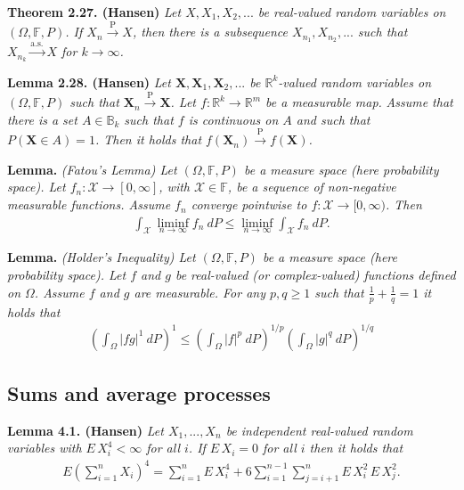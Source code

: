 \documentclass[a4paper,12pt,openany]{book}
\begin{document}
\textbf{Theorem 2.27. (Hansen)} \emph{Let \(X,X_1,X_2,...\) be real-valued random variables on \((\Omega,\mathbb{F},P)\). If \(X_n\stackrel{\text{P}}{\to} X\), then there is a subsequence \(X_{n_1},X_{n_2},...\) such that \(X_{n_k}\stackrel{\text{a.s.}}{\to} X\) for \(k\to \infty\).}

\textbf{Lemma 2.28. (Hansen)} \emph{Let \(\mathbf{X},\mathbf{X}_1,\mathbf{X}_2,...\) be \(\mathbb{R}^k\)-valued random variables on \((\Omega,\mathbb{F},P)\) such that \(\mathbf{X}_n\stackrel{\text{P}}{\to} \mathbf{X}\). Let \(f : \mathbb{R}^k\to \mathbb{R}^m\) be a measurable map.}
\emph{Assume that there is a set \(A\in\mathbb{B}_k\) such that \(f\) is continuous on \(A\) and such that \(P(\mathbf{X}\in A)=1\). Then it holds that \(f(\mathbf{X}_n)\stackrel{\text{P}}{\to} f(\mathbf{X})\).}

\textbf{Lemma.} \emph{(Fatou's Lemma) Let \((\Omega,\mathbb{F},P)\) be a measure space (here probability space). Let \(f_n : \mathcal{X} \to [0,\infty]\), with \(\mathcal{X}\in\mathbb{F}\), be a sequence of non-negative measurable functions. Assume \(f_n\) converge pointwise to \(f : \mathcal{X}\to [0,\infty)\). Then}
\begin{align*}
    \int_{\mathcal{X}} \liminf_{n\to\infty} f_n\ dP\le \liminf_{n\to\infty} \int_{\mathcal{X}} f_n\ dP.
\end{align*}

\textbf{Lemma.} \emph{(Holder's Inequality)  Let \((\Omega,\mathbb{F},P)\) be a measure space (here probability space). Let \(f\) and \(g\) be real-valued (or complex-valued) functions defined on \(\Omega\). Assume \(f\) and \(g\) are measurable. For any \(p,q\ge 1\) such that \(\frac{1}{p}+\frac{1}{q}=1\) it holds that }
\begin{align*}
    \left(\int_\Omega \vert fg\vert^1\ dP\right)^1\le \left(\int_\Omega \vert f\vert^p\ dP\right)^{1/p}\left(\int_\Omega \vert g\vert^q\ dP\right)^{1/q}
\end{align*}

\hypertarget{sums-and-average-processes}{%
\subsection{Sums and average processes}\label{sums-and-average-processes}}

\textbf{Lemma 4.1. (Hansen)} \emph{Let \(X_1,...,X_n\) be independent real-valued random variables with \(E\, X_i^4<\infty\) for all \(i\). If \(E\, X_i=0\) for all \(i\) then it holds that}
\begin{align*}
    E\left(\sum_{i=1}^n X_i\right)^4=\sum_{i=1}^n E\, X_i^4+6\sum_{i=1}^{n-1}\sum_{j=i+1}^n E\, X_i^2\,E\,X_j^2.
\end{align*}
\end{document}

